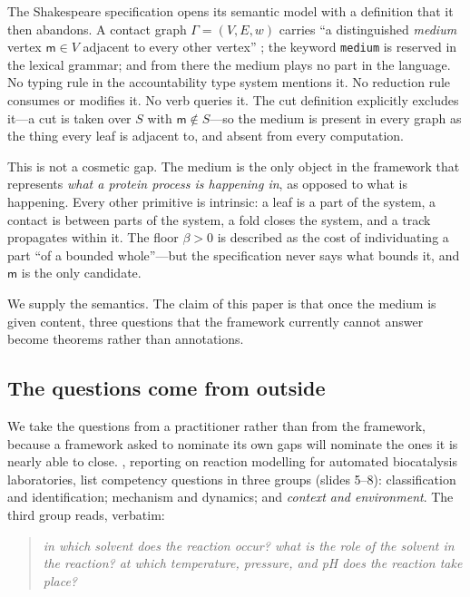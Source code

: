 \documentclass[11pt,twocolumn,a4paper]{article}
\theoremstyle{thmstyle}
\theoremstyle{definition}
\theoremstyle{remark}
\newcommand{\flo}{\beta}
\newcommand{\med}{\mathsf{m}}
\newcommand{\shk}[1]{\texttt{#1}}
\begin{document}
The Shakespeare specification \citep{sachikonye2026shakespeare} opens its
semantic model with a definition that it then abandons. A contact graph
$\Gamma=(V,E,w)$ carries ``a distinguished \emph{medium} vertex
$\med\in V$ adjacent to every other vertex''
\citep[Def.~2.1]{sachikonye2026shakespeare}; the keyword \shk{medium} is
reserved in the lexical grammar; and from there the medium plays no part
in the language. No typing rule in the accountability type system
mentions it. No reduction rule consumes or modifies it. No verb queries
it. The cut definition explicitly excludes it---a cut is taken over
$S$ with $\med\notin S$---so the medium is present in every graph as the
thing every leaf is adjacent to, and absent from every computation.

This is not a cosmetic gap. The medium is the only object in the
framework that represents \emph{what a protein process is happening in},
as opposed to what is happening. Every other primitive is intrinsic: a
leaf is a part of the system, a contact is between parts of the system,
a fold closes the system, and a track propagates within it. The floor
$\flo>0$ is described as the cost of individuating a part ``of a bounded
whole''---but the specification never says what bounds it, and $\med$ is
the only candidate.

We supply the semantics. The claim of this paper is that once the medium
is given content, three questions that the framework currently cannot
answer become theorems rather than annotations.

\subsection{The questions come from outside}

We take the questions from a practitioner rather than from the framework,
because a framework asked to nominate its own gaps will nominate the ones
it is nearly able to close. \citet{doerr2025limits}, reporting on
reaction modelling for automated biocatalysis laboratories, list
competency questions in three groups (slides 5--8): classification and
identification; mechanism and dynamics; and \emph{context and
environment}. The third group reads, verbatim:

\begin{quote}
\itshape
in which solvent does the reaction occur? \; what is the role of the
solvent in the reaction? \; at which temperature, pressure, and pH does
the reaction take place?
\end{quote}
\end{document}
